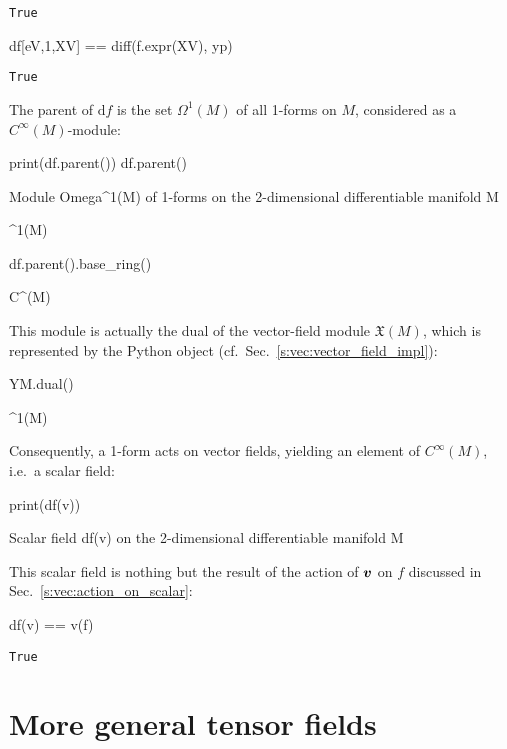 \begin{NBout}
\texttt{True}
\end{NBout}
\vspace*{-\baselineskip}
\begin{NBin}
df[eV,1,XV] == diff(f.expr(XV), yp)
\end{NBin}
\begin{NBout}
\texttt{True}
\end{NBout}
The parent of $\mathrm{d}f$ is the set $\Omega^1(M)$ of all 1-forms on $M$,
considered as a $C^\infty(M)$-module:
\begin{NBin}
print(df.parent())
df.parent()
\end{NBin}
\begin{NBprint}
Module Omega^1(M) of 1-forms on the 2-dimensional differentiable manifold M
\end{NBprint}
\begin{NBoutM}
\Omega^{1}\left(M\right)
\end{NBoutM}
\vspace*{-\baselineskip}
\begin{NBin}
df.parent().base_ring()
\end{NBin}
\begin{NBoutM}
C^{\infty}\left(M\right)
\end{NBoutM}
This module is actually the dual of the vector-field module $\mathfrak{X}(M)$,
which is represented
by the Python object  (cf.\ Sec.~\ref{s:vec:vector_field_impl}):
\begin{NBin}
YM.dual()
\end{NBin}
\begin{NBoutM}
\Omega^{1}\left(M\right)
\end{NBoutM}
Consequently, a 1-form acts on vector fields, yielding an element of
$C^\infty(M)$, i.e.\ a scalar field:
\begin{NBin}
print(df(v))
\end{NBin}
\begin{NBprint}
Scalar field df(v) on the 2-dimensional differentiable manifold M
\end{NBprint}
This scalar field is nothing but the result of the action of $\bm{v}$ on $f$
discussed in Sec.~\ref{s:vec:action_on_scalar}:
\begin{NBin}
df(v) == v(f)
\end{NBin}
\begin{NBout}
\texttt{True}
\end{NBout}

\section{More general tensor fields}

